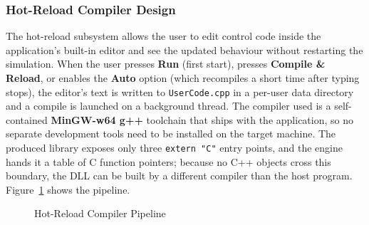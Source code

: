 \subsubsection{Hot-Reload Compiler Design}
The hot-reload subsystem allows the user to edit control code inside the application's built-in editor and see the updated behaviour without restarting the simulation. When the user presses \textbf{Run} (first start), presses \textbf{Compile \& Reload}, or enables the \textbf{Auto} option (which recompiles a short time after typing stops), the editor's text is written to \texttt{UserCode.cpp} in a per-user data directory and a compile is launched on a background thread. The compiler used is a self-contained \textbf{MinGW-w64 g++} toolchain that ships with the application, so no separate development tools need to be installed on the target machine. The produced library exposes only three \texttt{extern "C"} entry points, and the engine hands it a table of C function pointers; because no C++ objects cross this boundary, the DLL can be built by a different compiler than the host program. Figure~\ref{fig:hotreload} shows the pipeline.

\begin{figure}[htbp]
\centering
{}
\caption{Hot-Reload Compiler Pipeline}
\label{fig:hotreload}
\end{figure}

